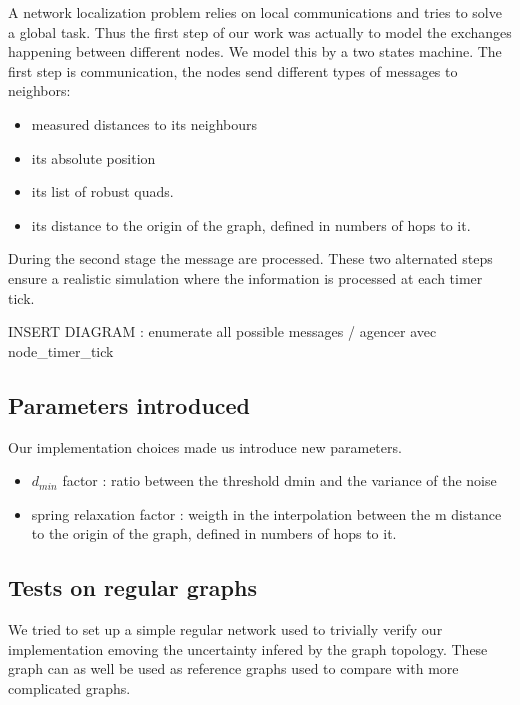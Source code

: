 \documentclass[letterpaper, 10 pt, conference]{ieeeconf}  %
\begin{document}
A network localization problem relies on local communications and tries to solve a global task. Thus the first step of our work was actually to model the exchanges happening between different nodes. We model this by a two states machine. The first step is communication, the nodes send different types of messages to neighbors:

\begin{itemize}

\item measured distances to its neighbours
\item its absolute position
\item its list of robust quads. %
\item its distance to the origin of the graph, defined in numbers of hops to it.

\end{itemize}

During the second stage the message are processed. These two alternated steps ensure a realistic simulation where the information is processed at each timer tick. 

INSERT DIAGRAM : enumerate all possible messages / agencer avec node\_timer\_tick

\subsection{Parameters introduced}

Our implementation choices made us introduce new parameters. 

\begin{itemize}
\item $d_{min}$ factor : ratio between the threshold dmin and the variance of the noise
\item spring relaxation factor : weigth in the interpolation between the m distance to the origin of the graph, defined in numbers of hops to it.
\end{itemize}


\subsection{Tests on regular graphs}

We tried to set up a simple regular network used to trivially verify our implementation emoving the uncertainty infered by the graph topology. These graph can as well be used as reference graphs used to compare with more complicated graphs.\newline
\end{document}
